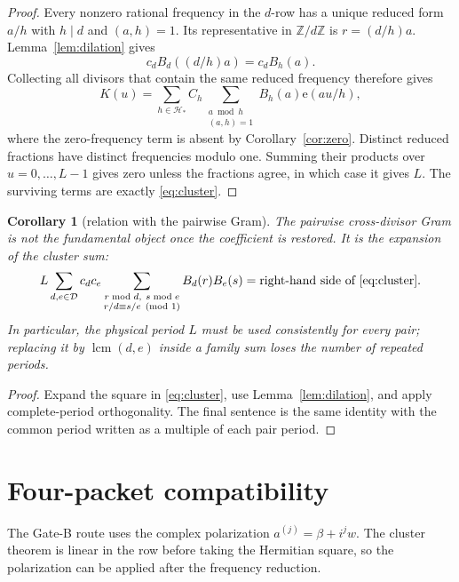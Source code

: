 \documentclass[11pt]{article}
\newtheorem{corollary}[theorem]{Corollary}
\theoremstyle{definition}
\theoremstyle{remark}
\newcommand{\ZZ}{\mathbb Z}
\newcommand{\Dd}{\mathcal D}
\newcommand{\ee}{\mathrm e}
\begin{document}
\begin{proof}
Every nonzero rational frequency in the $d$-row has a unique reduced form
$a/h$ with $h\mid d$ and $(a,h)=1$.  Its representative in $\ZZ/d\ZZ$ is
$r=(d/h)a$.  Lemma~\ref{lem:dilation} gives
\[
 c_dB_d((d/h)a)=c_dB_h(a).
\]
Collecting all divisors that contain the same reduced frequency therefore gives
\[
 K(u)=\sum_{h\in\mathcal H_*}C_h
 \sum_{\substack{a\bmod h\\(a,h)=1}}
 B_h(a)\ee(au/h),
\]
where the zero-frequency term is absent by Corollary~\ref{cor:zero}.  Distinct
reduced fractions have distinct frequencies modulo one.  Summing their products
over $u=0,\ldots,L-1$ gives zero unless the fractions agree, in which case it
gives $L$.  The surviving terms are exactly \eqref{eq:cluster}.
\end{proof}

\begin{corollary}[relation with the pairwise Gram]
\label{cor:pairwise}
The pairwise cross-divisor Gram is not the fundamental object once the
coefficient is restored.  It is the expansion of the cluster sum:
\begin{equation}
 L\sum_{d,e\in\Dd}c_dc_e
 \sum_{\substack{r\bmod d,\ s\bmod e\\r/d\equiv s/e\pmod 1}}
 B_d(r)B_e(s)
 =\text{right-hand side of \eqref{eq:cluster}}.
 \label{eq:pairwise-expansion}
\end{equation}
In particular, the physical period $L$ must be used consistently for every
pair; replacing it by $\operatorname{lcm}(d,e)$ inside a family sum loses the
number of repeated periods.
\end{corollary}

\begin{proof}
Expand the square in \eqref{eq:cluster}, use Lemma~\ref{lem:dilation}, and
apply complete-period orthogonality.  The final sentence is the same identity
with the common period written as a multiple of each pair period.
\end{proof}

\section{Four-packet compatibility}

The Gate-B route uses the complex polarization $a^{(j)}=\beta+i^jw$.
The cluster theorem is linear in the row before taking the Hermitian square, so
the polarization can be applied after the frequency reduction.
\end{document}
